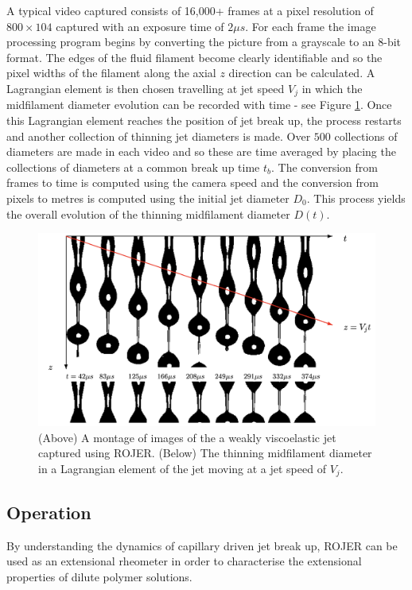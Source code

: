\documentclass[11pt]{article}
\begin{document}
A typical video captured consists of 16,000+ frames at a pixel resolution of $800 \times 104$ captured with an exposure time of $2 \mu s$. For each frame the image processing program begins by converting the picture from a grayscale to an 8-bit format. The edges of the fluid filament become clearly identifiable and so the pixel widths of the filament along the axial $z$ direction can be calculated. A Lagrangian element is then chosen travelling at jet speed $V_j$ in which the midfilament diameter evolution can be recorded with time - see Figure \ref{fig:image_analysis}. Once this Lagrangian element reaches the position of jet break up, the process restarts and another collection of thinning jet diameters is made. Over $500$ collections of diameters are made in each video and so these are time averaged by placing the collections of diameters at a common break up time $t_b$. The conversion from frames to time is computed using the camera speed and the conversion from pixels to metres is computed using the initial jet diameter $D_0$. This process yields the overall evolution of the thinning midfilament diameter $D(t)$.
\begin{figure}
	\includegraphics{img/image_analysis.png}
	\caption{(Above) A montage of images of the a weakly viscoelastic jet captured using ROJER. (Below) The thinning midfilament diameter in a Lagrangian element of the jet moving at a jet speed of $V_j$.}
	\label{fig:image_analysis}
\end{figure}

\subsection{Operation}
By understanding the dynamics of capillary driven jet break up, ROJER can be used as an extensional rheometer in order to characterise the extensional properties of dilute polymer solutions.
\end{document}
